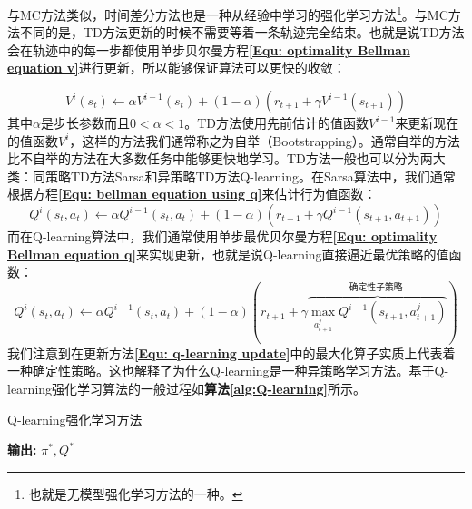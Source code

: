 与MC方法类似，时间差分方法也是一种从经验中学习的强化学习方法\footnote{也就是无模型强化学习方法的一种。}。与MC方法不同的是，TD方法更新的时候不需要等着一条轨迹完全结束。也就是说TD方法会在轨迹中的每一步都使用单步贝尔曼方程\textbf{\eqref{Equ: optimality Bellman equation v}}进行更新，所以能够保证算法可以更快的收敛：

\begin{equation}
    V^{i}\left(s_{t}\right) \longleftarrow \alpha V^{i-1}\left(s_{t}\right)+(1-\alpha)\left(r_{t+1}+\gamma V^{i-1}\left(s_{t+1}\right)\right)
\end{equation}
其中$\alpha$是步长参数而且$0<\alpha<1$。TD方法使用先前估计的值函数$V^{i-1}$来更新现在的值函数$V^{i}$，这样的方法我们通常称之为自举（Bootstrapping）。通常自举的方法比不自举的方法在大多数任务中能够更快地学习。TD方法一般也可以分为两大类：同策略TD方法Sarsa和异策略TD方法Q-learning。在Sarsa算法中，我们通常根据方程\textbf{\eqref{Equ: bellman equation using q}}来估计行为值函数：
\begin{equation}
\label{Equ: sarsa update}
    Q^{i}\left(s_{t}, a_{t}\right) \longleftarrow \alpha Q^{i-1}\left(s_{t}, a_{t}\right)+(1-\alpha)\left(r_{t+1}+\gamma Q^{i-1}\left(s_{t+1}, a_{t+1}\right)\right)
\end{equation}
而在Q-learning算法中，我们通常使用单步最优贝尔曼方程\textbf{\eqref{Equ: optimality Bellman equation q}}来实现更新，也就是说Q-learning直接逼近最优策略的值函数：
\begin{equation}
\label{Equ: q-learning update}
    Q^{i}\left(s_{t}, a_{t}\right) \longleftarrow \alpha Q^{i-1}\left(s_{t}, a_{t}\right)+(1-\alpha)(r_{t+1}+\gamma \overbrace{\max _{a_{t+1}^{j}} Q^{i-1}\left(s_{t+1}, a_{t+1}^{j}\right)}^{\text {确定性子策略 }})
\end{equation}
我们注意到在更新方法\textbf{\eqref{Equ: q-learning update}}中的最大化算子实质上代表着一种确定性策略。这也解释了为什么Q-learning是一种异策略学习方法。基于Q-learning强化学习算法的一般过程如\textbf{算法\ref{alg:Q-learning}}所示。
\begin{algorithm}[h]
	\caption{Q-learning强化学习方法}
	\label{alg:Q-learning}
	\begin{algorithmic}[1]
		\ENDWHILE
		\ENDFOR
	\end{algorithmic}
	\hspace*{0.02in} {\bf 输出:} $\pi^{*},Q^{*}$
\end{algorithm}


